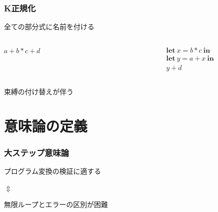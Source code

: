 \documentclass[dvipdfmx,cjk,xcolor=dvipsnames,envcountsect,notheorems,12pt]{beamer}
\theoremstyle{definition}
\newcommand{\keyword}[1]{\mathbf{#1}}
\newcommand{\LET}{\keyword{let}}
\newcommand{\IN}{\keyword{in}}
\begin{document}
\begin{frame}
	\frametitle{K正規化}
	\LARGE 
	全ての部分式に名前を付ける

	\begin{columns}
		\begin{column}{0.5\textwidth}
			\begin{center}
				$a+b*c+d$
			\end{center}
		\end{column}
		\begin{column}{0.5\textwidth}
			\begin{center}
				\[
					\begin{array}{l}
						\LET~x = b * c~\IN \\
						\LET~y = a + x~\IN \\
						y + d
					\end{array}
				\]
			\end{center}
		\end{column}
	\end{columns}

	\vfill

	束縛の付け替えが伴う
\end{frame}

\section{意味論の定義}

\begin{frame}
	\frametitle{大ステップ意味論}
	\LARGE
	\begin{center}
	プログラム変換の検証に適する

	\vfill

	$\Updownarrow$

	\vfill

	無限ループとエラーの区別が困難
	\end{center}
\end{frame}
\end{document}
